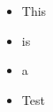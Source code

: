 \documentclass{article}
\begin{document}
\begin{multicols}{3}
\begin{itemize}
  \item This
  \item is
  \item a
  \item Test
\end{itemize}
\end{multicols}
\end{document}
